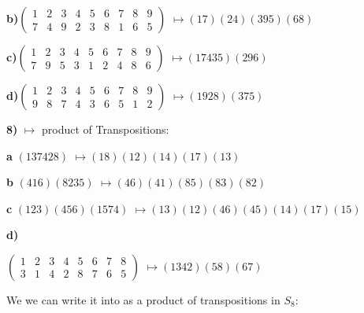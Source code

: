 \documentclass{article}
\begin{document}
\bigskip

\hspace{.2in}\textbf{b)}$(\begin{smallmatrix}
1 & 2 & 3 & 4 & 5 & 6 & 7 & 8 & 9\\
7 & 4 & 9 & 2 & 3 & 8 & 1 & 6 & 5
\end{smallmatrix})$			$\mapsto(17)(24)(395)(68)$

\bigskip

\hspace{.2in}\textbf{c)}$(\begin{smallmatrix}
1 & 2 & 3 & 4 & 5 & 6 & 7 & 8 & 9\\
7 & 9 & 5 & 3 & 1 & 2 & 4 & 8 & 6
\end{smallmatrix})$			$\mapsto(17435)(296)$

\bigskip

\hspace{.2in}\textbf{d)}$(\begin{smallmatrix} 
1 & 2 & 3 & 4 & 5 & 6 & 7 & 8 & 9\\
9 & 8 & 7 & 4 & 3 & 6 & 5 & 1 & 2
\end{smallmatrix})$			$\mapsto(1928)(375)$

\bigskip

\bigskip

\textbf{8)}  $\mapsto$ product of Transpositions: 

\bigskip

\hspace{.2in}\textbf{a}  $(137428)$	$\mapsto(18)(12)(14)(17)(13)$

\bigskip

\hspace{.2in}\textbf{b} $(416)(8235)$	$\mapsto(46)(41)(85)(83)(82)$
\bigskip


\hspace{.2in}\textbf{c} $(123)(456)(1574)$	$\mapsto(13)(12)(46)(45)(14)(17)(15)$

\bigskip


\hspace{.2in}\textbf{d)}    
\begin{center}
$(\begin{smallmatrix}
1 & 2 & 3 & 4 & 5 & 6 & 7 & 8 \\
3 & 1 & 4 & 2 & 8 & 7 & 6 & 5
\end{smallmatrix})$			$\mapsto(1342)(58)(67)$
\end{center}

We we can write it into as a product of transpositions in $S_8$:
\end{document}
